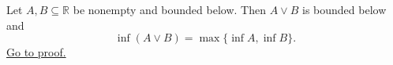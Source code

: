 \begin{theorem}
\label{thm:infimum-pairwise-maximum-set}
Let $A,B\subseteq\mathbb{R}$ be nonempty and bounded below. Then $A\vee B$
is bounded below and
\[
\inf(A\vee B)=\max\{\inf A,\inf B\}.
\]
\hyperref[prf:infimum-pairwise-maximum-set]{Go to proof.}
\end{theorem}